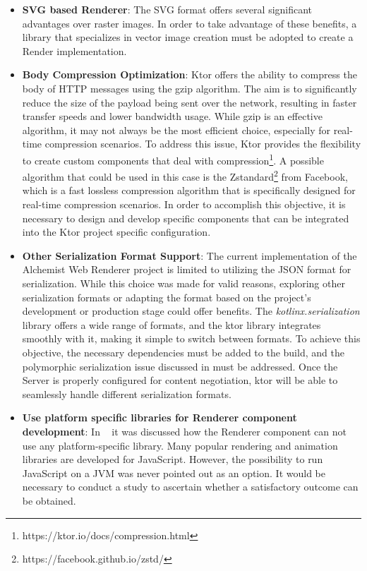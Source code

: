 \begin{itemize}
	\item \textbf{SVG based Renderer}: The SVG format offers several significant advantages over raster images. In order to take advantage of these benefits, a library that specializes in vector image creation must be adopted to create a Render implementation.
	\item \textbf{Body Compression Optimization}: Ktor offers the ability to compress the body of HTTP messages using the gzip algorithm. The aim is to significantly reduce the size of the payload being sent over the network, resulting in faster transfer speeds and lower bandwidth usage. While gzip is an effective algorithm, it may not always be the most efficient choice, especially for real-time compression scenarios. To address this issue, Ktor provides the flexibility to create custom components that deal with compression\footnote{https://ktor.io/docs/compression.html}. A possible algorithm that could be used in this case is the Zstandard\footnote{https://facebook.github.io/zstd/} from Facebook, which is a fast lossless compression algorithm that is specifically designed for real-time compression scenarios. In order to accomplish this objective, it is necessary to design and develop specific components that can be integrated into the Ktor project specific configuration.
	\item \textbf{Other Serialization Format Support}: The current implementation of the Alchemist Web Renderer project is limited to utilizing the JSON format for serialization. While this choice was made for valid reasons, exploring other serialization formats or adapting the format based on the project's development or production stage could offer benefits. The \textit{kotlinx.serialization} library offers a wide range of formats, and the ktor library integrates smoothly with it, making it simple to switch between formats. To achieve this objective, the necessary dependencies must be added to the build, and the polymorphic serialization issue discussed in  must be addressed. Once the Server is properly configured for content negotiation, ktor will be able to seamlessly handle different serialization formats.
	\item \textbf{Use platform specific libraries for Renderer component development}: In ~ it was discussed how the Renderer component can not use any platform-specific library. Many popular rendering and animation libraries are developed for JavaScript. However, the possibility to run JavaScript on a JVM was never pointed out as an option. It would be necessary to conduct a study to ascertain whether a satisfactory outcome can be obtained.
\end{itemize}
